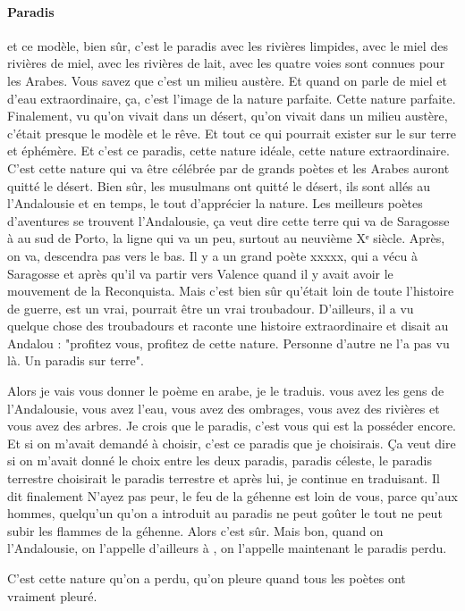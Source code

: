 \paragraph{Paradis}et ce modèle, bien sûr, c'est le paradis avec les rivières limpides, avec le miel des rivières de miel, avec les rivières de lait, avec les quatre voies sont connues pour les Arabes.
Vous savez que c'est un milieu austère. Et quand on parle de miel et d'eau extraordinaire, ça, c'est l'image de la nature parfaite. Cette nature parfaite. Finalement, vu qu'on vivait dans un désert, qu'on vivait dans un milieu austère, c'était presque le modèle et le rêve. Et tout ce qui pourrait exister sur le sur terre et éphémère. Et c'est ce paradis, cette nature idéale, cette nature extraordinaire.
C'est cette nature qui va être célébrée par de grands poètes et les Arabes auront quitté le désert. Bien sûr, les musulmans ont quitté le désert, ils sont allés au l'Andalousie et en temps, le tout d'apprécier la nature. Les meilleurs poètes d'aventures se trouvent l'Andalousie, ça veut dire cette terre qui va de Saragosse à au sud de Porto, la ligne qui va un peu, surtout au neuvième Xᵉ siècle.
Après, on va, descendra pas vers le bas. Il y a un grand poète xxxxx, qui a vécu à Saragosse et après qu'il va partir vers Valence quand il y avait avoir le mouvement de la Reconquista. Mais c'est bien sûr qu'était loin de toute l'histoire de guerre, est un vrai, pourrait être un vrai troubadour. D'ailleurs, il a vu quelque chose des troubadours et raconte une histoire extraordinaire et disait au Andalou : "profitez vous, profitez de cette nature.
Personne d'autre ne l'a pas vu là. Un paradis sur terre". 

Alors je vais vous donner le poème en arabe, je le traduis.  vous avez les gens de l'Andalousie, vous avez l'eau, vous avez des ombrages, vous avez des rivières et vous avez des arbres.
Je crois que le paradis, c'est vous qui est la posséder encore. Et si on m'avait demandé à choisir, c'est ce paradis que je choisirais. Ça veut dire si on m'avait donné le choix entre les deux paradis, paradis céleste, le paradis terrestre choisirait le paradis terrestre et après lui, je continue en traduisant. Il dit finalement N'ayez pas peur, le feu de la géhenne est loin de vous, parce qu'aux hommes, quelqu'un qu'on a introduit au paradis ne peut goûter le tout ne peut subir les flammes de la géhenne.
Alors c'est sûr. Mais bon, quand on l'Andalousie, on l'appelle d'ailleurs à , on l'appelle maintenant le paradis perdu.  


C'est cette nature qu'on a perdu, qu'on pleure quand tous les poètes ont vraiment pleuré. 

